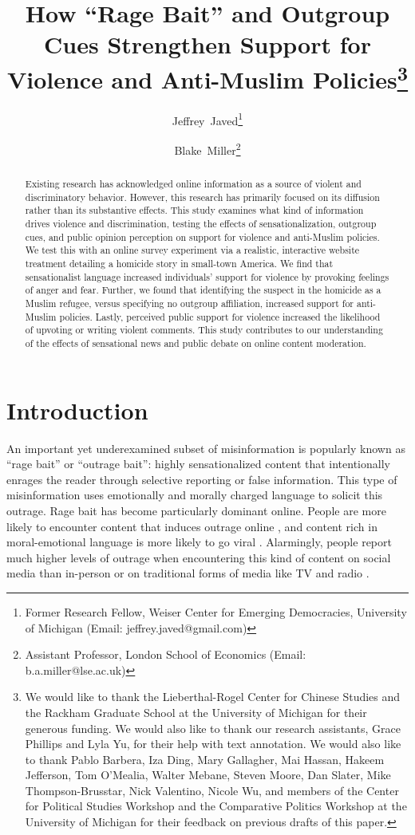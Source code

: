 \documentclass[12pt, letterpaper]{article}
\title{How ``Rage Bait'' and Outgroup Cues Strengthen Support for Violence and Anti-Muslim Policies\thanks{We would like to thank the Lieberthal-Rogel Center for Chinese Studies and the Rackham Graduate School at the University of Michigan for their generous funding. We would also like to thank our research assistants, Grace Phillips and Lyla Yu, for their help with text annotation. We would also like to thank Pablo Barbera, Iza Ding, Mary Gallagher, Mai Hassan, Hakeem Jefferson, Tom O’Mealia, Walter Mebane, Steven Moore, Dan Slater, Mike Thompson-Brusstar, Nick Valentino, Nicole Wu, and members of the Center for Political Studies Workshop and the Comparative Politics Workshop at the University of Michigan for their feedback on previous drafts of this paper.}}
\author{Jeffrey\ Javed\thanks{\normalsize{Former Research Fellow, Weiser Center for Emerging Democracies, University of Michigan (Email: \mbox{jeffrey.javed@gmail.com})}} \and Blake\ Miller\thanks{\normalsize{Assistant Professor, London School of Economics} (Email: \mbox{b.a.miller@lse.ac.uk})}}
\date{}
\begin{document}
 
\maketitle
\doublespacing
\vspace{-2em}\begin{abstract}
\begin{normalsize}
\noindent Existing research has acknowledged online information as a source of violent and discriminatory behavior. However, this research has primarily focused on its diffusion rather than its substantive effects. This study examines what kind of information drives violence and discrimination, testing the effects of sensationalization, outgroup cues, and public opinion perception on support for violence and anti-Muslim policies. We test this with an online survey experiment via a realistic, interactive website treatment detailing a homicide story in small-town America. We find that sensationalist language increased individuals' support for violence by provoking feelings of anger and fear. Further, we found that identifying the suspect in the homicide as a Muslim refugee, versus specifying no outgroup affiliation, increased support for anti-Muslim policies. Lastly, perceived public support for violence increased the likelihood of upvoting or writing violent comments. This study contributes to our understanding of the effects of sensational news and public debate on online content moderation.
\end{normalsize}
\end{abstract}

\begin{center}
\end{center}

\thispagestyle{empty}
\setcounter{page}{1}

\section{Introduction}

An important yet underexamined subset of misinformation is popularly known as ``rage bait'' or ``outrage bait'': highly sensationalized content that intentionally enrages the reader through selective reporting or false information. This type of misinformation uses emotionally and morally charged language to solicit this outrage. Rage bait has become particularly dominant online. People are more likely to encounter content that induces outrage online \citep{crockett2017moral}, and content rich in moral-emotional language is more likely to go viral \citep{brady2017emotion, fan2014anger}. Alarmingly, people report much higher levels of outrage when encountering this kind of content on social media than in-person or on traditional forms of media like TV and radio \citep{crockett2017moral}.
\end{document}
